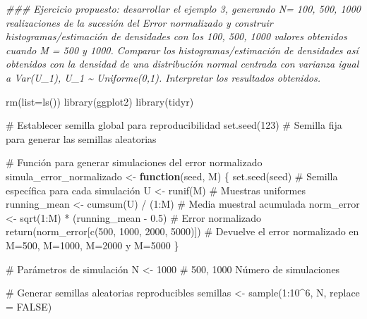 \documentclass[
  letterpaper,
  DIV=11,
  numbers=noendperiod]{scrreprt}
\newenvironment{Shaded}{\begin{snugshade}}{\end{snugshade}}
\newcommand{\AttributeTok}[1]{\textcolor[rgb]{0.40,0.45,0.13}{#1}}
\newcommand{\CommentTok}[1]{\textcolor[rgb]{0.37,0.37,0.37}{#1}}
\newcommand{\ConstantTok}[1]{\textcolor[rgb]{0.56,0.35,0.01}{#1}}
\newcommand{\ControlFlowTok}[1]{\textcolor[rgb]{0.00,0.23,0.31}{\textbf{#1}}}
\newcommand{\DecValTok}[1]{\textcolor[rgb]{0.68,0.00,0.00}{#1}}
\newcommand{\DocumentationTok}[1]{\textcolor[rgb]{0.37,0.37,0.37}{\textit{#1}}}
\newcommand{\FloatTok}[1]{\textcolor[rgb]{0.68,0.00,0.00}{#1}}
\newcommand{\FunctionTok}[1]{\textcolor[rgb]{0.28,0.35,0.67}{#1}}
\newcommand{\NormalTok}[1]{\textcolor[rgb]{0.00,0.23,0.31}{#1}}
\newcommand{\OtherTok}[1]{\textcolor[rgb]{0.00,0.23,0.31}{#1}}
\newcommand{\SpecialCharTok}[1]{\textcolor[rgb]{0.37,0.37,0.37}{#1}}
\begin{document}
\begin{Shaded}
\begin{Highlighting}[]
\DocumentationTok{\#\#\# Ejercicio propuesto: desarrollar el ejemplo 3, generando N= 100, 500, 1000 realizaciones de la sucesión del Error normalizado y construir histogramas/estimación de densidades con los 100, 500, 1000 valores obtenidos cuando M = 500 y 1000. Comparar los histogramas/estimación de densidades así obtenidos con la densidad de una distribución normal centrada con varianza igual a Var(U\_1), U\_1 \textasciitilde{} Uniforme(0,1). Interpretar los resultados obtenidos.}

\FunctionTok{rm}\NormalTok{(}\AttributeTok{list=}\FunctionTok{ls}\NormalTok{())}
\FunctionTok{library}\NormalTok{(ggplot2)}
\FunctionTok{library}\NormalTok{(tidyr)}

\CommentTok{\# Establecer semilla global para reproducibilidad}
\FunctionTok{set.seed}\NormalTok{(}\DecValTok{123}\NormalTok{)  }\CommentTok{\# Semilla fija para generar las semillas aleatorias}

\CommentTok{\# Función para generar simulaciones del error normalizado}
\NormalTok{simula\_error\_normalizado }\OtherTok{\textless{}{-}} \ControlFlowTok{function}\NormalTok{(seed, M) \{}
  \FunctionTok{set.seed}\NormalTok{(seed)  }\CommentTok{\# Semilla específica para cada simulación}
\NormalTok{  U }\OtherTok{\textless{}{-}} \FunctionTok{runif}\NormalTok{(M)  }\CommentTok{\# Muestras uniformes}
\NormalTok{  running\_mean }\OtherTok{\textless{}{-}} \FunctionTok{cumsum}\NormalTok{(U) }\SpecialCharTok{/}\NormalTok{ (}\DecValTok{1}\SpecialCharTok{:}\NormalTok{M)  }\CommentTok{\# Media muestral acumulada}
\NormalTok{  norm\_error }\OtherTok{\textless{}{-}} \FunctionTok{sqrt}\NormalTok{(}\DecValTok{1}\SpecialCharTok{:}\NormalTok{M) }\SpecialCharTok{*}\NormalTok{ (running\_mean }\SpecialCharTok{{-}} \FloatTok{0.5}\NormalTok{)  }\CommentTok{\# Error normalizado}
  \FunctionTok{return}\NormalTok{(norm\_error[}\FunctionTok{c}\NormalTok{(}\DecValTok{500}\NormalTok{, }\DecValTok{1000}\NormalTok{, }\DecValTok{2000}\NormalTok{, }\DecValTok{5000}\NormalTok{)])  }\CommentTok{\# Devuelve el error normalizado en M=500, M=1000, M=2000 y M=5000}
\NormalTok{\}}

\CommentTok{\# Parámetros de simulación}
\NormalTok{N }\OtherTok{\textless{}{-}} \DecValTok{1000} \CommentTok{\# 500, 1000 Número de simulaciones}

\CommentTok{\# Generar semillas aleatorias reproducibles}
\NormalTok{semillas }\OtherTok{\textless{}{-}} \FunctionTok{sample}\NormalTok{(}\DecValTok{1}\SpecialCharTok{:}\DecValTok{10}\SpecialCharTok{\^{}}\DecValTok{6}\NormalTok{, N, }\AttributeTok{replace =} \ConstantTok{FALSE}\NormalTok{)}


\end{Highlighting}
\end{Shaded}
\end{document}
